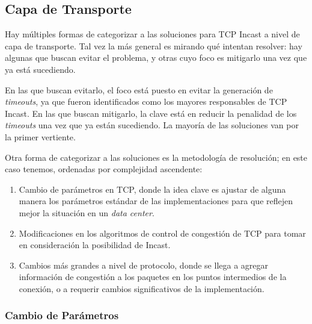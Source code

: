 \documentclass[runningheads,a4paper]{llncs}
\begin{document}
\subsection{Capa de Transporte}

Hay múltiples formas de categorizar a las soluciones para TCP Incast a nivel de capa de transporte. Tal vez la más general es mirando qué intentan resolver: hay algunas que buscan evitar el problema, y otras cuyo foco es mitigarlo una vez que ya está sucediendo.

En las que buscan evitarlo, el foco está puesto en evitar la generación de \textit{timeouts}, ya que fueron identificados como los mayores responsables de TCP Incast. En las que buscan mitigarlo, la clave está en reducir la penalidad de los \textit{timeouts} una vez que ya están sucediendo. La mayoría de las soluciones van por la primer vertiente.

Otra forma de categorizar a las soluciones es la metodología de resolución; en este caso tenemos, ordenadas por complejidad ascendente:

\begin{enumerate}
    \item Cambio de parámetros en TCP, donde la idea clave es ajustar de alguna manera los parámetros estándar de las implementaciones para que reflejen mejor la situación en un \textit{data center}.
    
    \item Modificaciones en los algoritmos de control de congestión de TCP para tomar en consideración la posibilidad de Incast.
    
    \item Cambios más grandes a nivel de protocolo, donde se llega a agregar información de congestión a los paquetes en los puntos intermedios de la conexión, o a requerir cambios significativos de la implementación.
\end{enumerate}


\subsubsection{Cambio de Parámetros}
\end{document}
